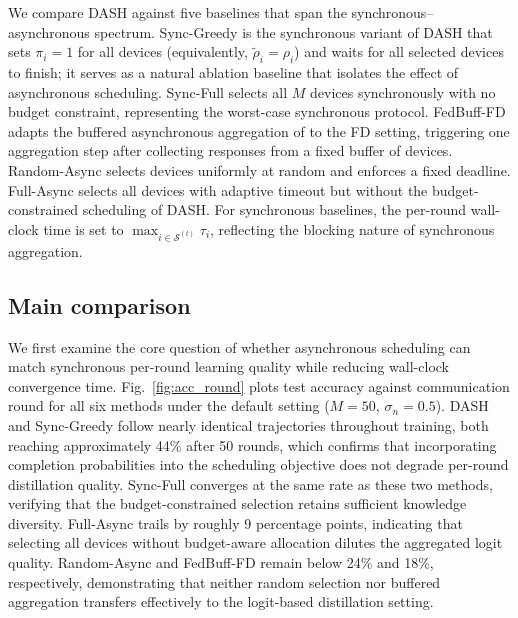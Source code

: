 \documentclass[a4paper,fleqn]{cas-dc}
\newcommand{\Sset}{\mathcal{S}}
\begin{document}
	We compare DASH against five baselines that span the synchronous--asynchronous
	spectrum.  Sync-Greedy is the synchronous variant of DASH that sets
	$\pi_i = 1$ for all devices (equivalently,
	$\tilde{\rho}_i = \rho_i$) and waits for all selected devices to
	finish; it serves as a natural ablation baseline that isolates the
	effect of asynchronous scheduling.  Sync-Full selects all $M$
	devices synchronously with no budget constraint, representing the
	worst-case synchronous protocol.  FedBuff-FD adapts the buffered
	asynchronous aggregation of \citet{nguyen_fedbuff_2022} to the FD
	setting, triggering one aggregation step after collecting responses
	from a fixed buffer of devices.  Random-Async selects devices
	uniformly at random and enforces a fixed deadline.  Full-Async
	selects all devices with adaptive timeout but without the
	budget-constrained scheduling of DASH.  For synchronous baselines,
	the per-round wall-clock time is set to
	$\max_{i \in \Sset^{(t)}} \tau_i$, reflecting the blocking nature
	of synchronous aggregation.
	
	\subsection{Main comparison}\label{sec:main_compare}
	
	We first examine the core question of whether asynchronous scheduling
	can match synchronous per-round learning quality while reducing
	wall-clock convergence time.  Fig.~\ref{fig:acc_round} plots test
	accuracy against communication round for all six methods under the
	default setting ($M = 50$, $\sigma_n = 0.5$).  DASH and Sync-Greedy
	follow nearly identical trajectories throughout training, both
	reaching approximately 44\% after 50 rounds, which confirms that
	incorporating completion probabilities into the scheduling objective
	does not degrade per-round distillation quality.  Sync-Full converges
	at the same rate as these two methods, verifying that the
	budget-constrained selection retains sufficient knowledge diversity.
	Full-Async trails by roughly 9 percentage points, indicating that
	selecting all devices without budget-aware allocation dilutes the
	aggregated logit quality.  Random-Async and FedBuff-FD remain below
	24\% and 18\%, respectively, demonstrating that neither random
	selection nor buffered aggregation transfers effectively to the
	logit-based distillation setting.
	
\end{document}
